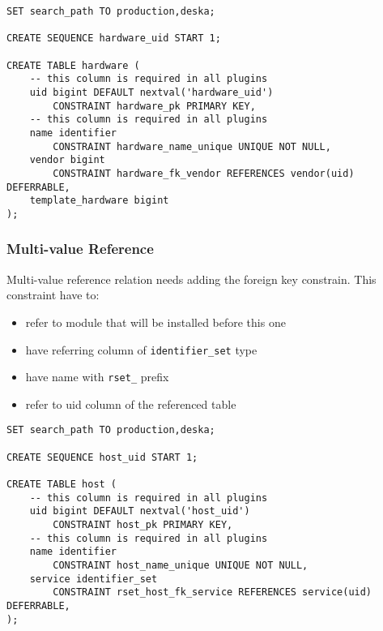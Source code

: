 \documentclass[deska]{subfiles}
\begin{document}
\begin{verbatim}
SET search_path TO production,deska;

CREATE SEQUENCE hardware_uid START 1;

CREATE TABLE hardware (
    -- this column is required in all plugins
    uid bigint DEFAULT nextval('hardware_uid')
        CONSTRAINT hardware_pk PRIMARY KEY,
    -- this column is required in all plugins
    name identifier
        CONSTRAINT hardware_name_unique UNIQUE NOT NULL,
    vendor bigint 
        CONSTRAINT hardware_fk_vendor REFERENCES vendor(uid) DEFERRABLE,
    template_hardware bigint
);
\end{verbatim}


\subsubsection{Multi-value Reference}
Multi-value reference relation needs adding the foreign key constrain. This constraint have to:
\begin{itemize}
    \item refer to module that will be installed before this one
    \item have referring column of {\tt identifier\_set} type
    \item have name with {\tt rset\_} prefix
    \item refer to uid column of the referenced table
\end{itemize}

\begin{verbatim}
SET search_path TO production,deska;

CREATE SEQUENCE host_uid START 1;

CREATE TABLE host (
    -- this column is required in all plugins
    uid bigint DEFAULT nextval('host_uid')
        CONSTRAINT host_pk PRIMARY KEY,
    -- this column is required in all plugins
    name identifier
        CONSTRAINT host_name_unique UNIQUE NOT NULL,
    service identifier_set
        CONSTRAINT rset_host_fk_service REFERENCES service(uid) DEFERRABLE,
);
\end{verbatim}
\end{document}
